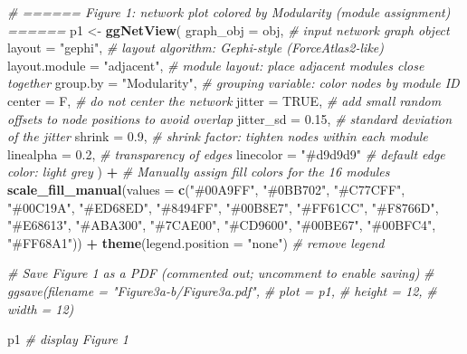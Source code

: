 \documentclass[
]{book}
\newenvironment{Shaded}{\begin{snugshade}}{\end{snugshade}}
\newcommand{\AttributeTok}[1]{\textcolor[rgb]{0.13,0.29,0.53}{#1}}
\newcommand{\CommentTok}[1]{\textcolor[rgb]{0.56,0.35,0.01}{\textit{#1}}}
\newcommand{\ConstantTok}[1]{\textcolor[rgb]{0.56,0.35,0.01}{#1}}
\newcommand{\FloatTok}[1]{\textcolor[rgb]{0.00,0.00,0.81}{#1}}
\newcommand{\FunctionTok}[1]{\textcolor[rgb]{0.13,0.29,0.53}{\textbf{#1}}}
\newcommand{\NormalTok}[1]{#1}
\newcommand{\OtherTok}[1]{\textcolor[rgb]{0.56,0.35,0.01}{#1}}
\newcommand{\SpecialCharTok}[1]{\textcolor[rgb]{0.81,0.36,0.00}{\textbf{#1}}}
\newcommand{\StringTok}[1]{\textcolor[rgb]{0.31,0.60,0.02}{#1}}
\begin{document}
\begin{Shaded}
\begin{Highlighting}[]
\CommentTok{\# ====== Figure 1: network plot colored by Modularity (module assignment) ======}
\NormalTok{p1 }\OtherTok{\textless{}{-}} \FunctionTok{ggNetView}\NormalTok{(}
  \AttributeTok{graph\_obj     =}\NormalTok{ obj,           }\CommentTok{\# input network graph object}
  \AttributeTok{layout        =} \StringTok{"gephi"}\NormalTok{,       }\CommentTok{\# layout algorithm: Gephi{-}style (ForceAtlas2{-}like)}
  \AttributeTok{layout.module =} \StringTok{"adjacent"}\NormalTok{,    }\CommentTok{\# module layout: place adjacent modules close together}
  \AttributeTok{group.by      =} \StringTok{"Modularity"}\NormalTok{,  }\CommentTok{\# grouping variable: color nodes by module ID}
  \AttributeTok{center        =}\NormalTok{ F,             }\CommentTok{\# do not center the network}
  \AttributeTok{jitter        =} \ConstantTok{TRUE}\NormalTok{,          }\CommentTok{\# add small random offsets to node positions to avoid overlap}
  \AttributeTok{jitter\_sd     =} \FloatTok{0.15}\NormalTok{,          }\CommentTok{\# standard deviation of the jitter}
  \AttributeTok{shrink        =} \FloatTok{0.9}\NormalTok{,           }\CommentTok{\# shrink factor: tighten nodes within each module}
  \AttributeTok{linealpha     =} \FloatTok{0.2}\NormalTok{,           }\CommentTok{\# transparency of edges}
  \AttributeTok{linecolor     =} \StringTok{"\#d9d9d9"}      \CommentTok{\# default edge color: light grey}
\NormalTok{) }\SpecialCharTok{+} 
  \CommentTok{\# Manually assign fill colors for the 16 modules}
  \FunctionTok{scale\_fill\_manual}\NormalTok{(}\AttributeTok{values =} \FunctionTok{c}\NormalTok{(}\StringTok{"\#00A9FF"}\NormalTok{, }\StringTok{"\#0BB702"}\NormalTok{, }\StringTok{"\#C77CFF"}\NormalTok{, }\StringTok{"\#00C19A"}\NormalTok{, }\StringTok{"\#ED68ED"}\NormalTok{, }
                               \StringTok{"\#8494FF"}\NormalTok{, }\StringTok{"\#00B8E7"}\NormalTok{, }\StringTok{"\#FF61CC"}\NormalTok{, }\StringTok{"\#F8766D"}\NormalTok{, }\StringTok{"\#E68613"}\NormalTok{,}
                               \StringTok{"\#ABA300"}\NormalTok{, }\StringTok{"\#7CAE00"}\NormalTok{, }\StringTok{"\#CD9600"}\NormalTok{, }\StringTok{"\#00BE67"}\NormalTok{, }\StringTok{"\#00BFC4"}\NormalTok{,}
                               \StringTok{"\#FF68A1"}\NormalTok{)) }\SpecialCharTok{+} 
  \FunctionTok{theme}\NormalTok{(}\AttributeTok{legend.position =} \StringTok{"none"}\NormalTok{)    }\CommentTok{\# remove legend}

\CommentTok{\# Save Figure 1 as a PDF (commented out; uncomment to enable saving)}
\CommentTok{\# ggsave(filename = "Figure3a{-}b/Figure3a.pdf",}
\CommentTok{\#        plot     = p1,}
\CommentTok{\#        height   = 12,}
\CommentTok{\#        width    = 12)}

\NormalTok{p1   }\CommentTok{\# display Figure 1}
\end{Highlighting}
\end{Shaded}
\end{document}
